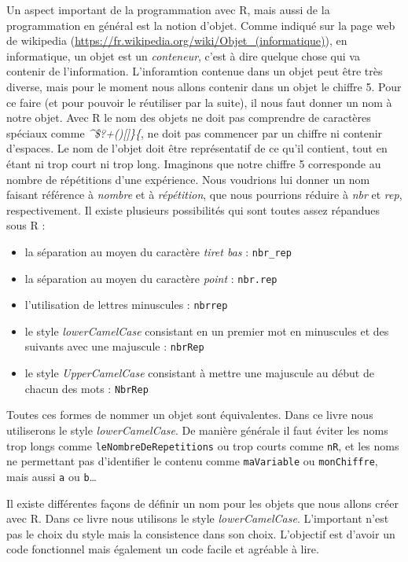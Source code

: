 \documentclass[]{book}
\providecommand{\tightlist}{%
  \setlength{\itemsep}{0pt}\setlength{\parskip}{0pt}}
\theoremstyle{definition}
\theoremstyle{definition}
\theoremstyle{definition}
\theoremstyle{remark}
\begin{document}
Un aspect important de la programmation avec R, mais aussi de la
programmation en général est la notion d'objet. Comme indiqué sur la
page web de wikipedia
(\url{https://fr.wikipedia.org/wiki/Objet_(informatique)}), en
informatique, un objet est un \emph{conteneur}, c'est à dire quelque
chose qui va contenir de l'information. L'inforamtion contenue dans un
objet peut être très diverse, mais pour le moment nous allons contenir
dans un objet le chiffre 5. Pour ce faire (et pour pouvoir le réutiliser
par la suite), il nous faut donner un nom à notre objet. Avec R le nom
des objets ne doit pas comprendre de caractères spéciaux comme
\emph{\^{}\$?\textbar{}+(){[}{]}\}\{}, ne doit pas commencer par un
chiffre ni contenir d'espaces. Le nom de l'objet doit être représentatif
de ce qu'il contient, tout en étant ni trop court ni trop long.
Imaginons que notre chiffre 5 corresponde au nombre de répétitions d'une
expérience. Nous voudrions lui donner un nom faisant référence à
\emph{nombre} et à \emph{répétition}, que nous pourrions réduire à
\emph{nbr} et \emph{rep}, respectivement. Il existe plusieurs
possibilités qui sont toutes assez répandues sous R :

\begin{itemize}
\tightlist
\item
  la séparation au moyen du caractère \emph{tiret bas} :
  \texttt{nbr\_rep}
\item
  la séparation au moyen du caractère \emph{point} : \texttt{nbr.rep}
\item
  l'utilisation de lettres minuscules : \texttt{nbrrep}
\item
  le style \emph{lowerCamelCase} consistant en un premier mot en
  minuscules et des suivants avec une majuscule : \texttt{nbrRep}
\item
  le style \emph{UpperCamelCase} consistant à mettre une majuscule au
  début de chacun des mots : \texttt{NbrRep}
\end{itemize}

Toutes ces formes de nommer un objet sont équivalentes. Dans ce livre
nous utiliserons le style \emph{lowerCamelCase}. De manière générale il
faut éviter les noms trop longs comme \texttt{leNombreDeRepetitions} ou
trop courts comme \texttt{nR}, et les noms ne permettant pas
d'identifier le contenu comme \texttt{maVariable} ou
\texttt{monChiffre}, mais aussi \texttt{a} ou \texttt{b}\ldots{}

Il existe différentes façons de définir un nom pour les objets que nous
allons créer avec R. Dans ce livre nous utilisons le style
\emph{lowerCamelCase}. L'important n'est pas le choix du style mais la
consistence dans son choix. L'objectif est d'avoir un code fonctionnel
mais également un code facile et agréable à lire.
\end{document}
